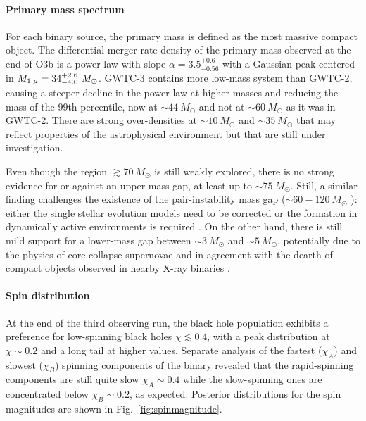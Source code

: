 \documentclass[a4paper,titlepage]{book}     	%
\newcommand{\sun}{\ensuremath{_\odot}}
\newcommand{\msun}{\ensuremath{M\sun}}
\begin{document}
\paragraph{Primary mass spectrum}
For each binary source, the primary mass is defined as the most massive compact object. The differential merger rate density of the primary mass observed at the end of O3b is a power-law with slope $\alpha = 3.5_{-0.56}^{+0.6}$ with a Gaussian peak centered in $M_{\rm 1,\mu} = 34_{-4.0}^{+2.6}~ \msun$. GWTC-3 contains more low-mass system than GWTC-2, causing a steeper decline in the power law at higher masses and reducing the mass of the 99th percentile, now at $\sim 44~\msun$ and not at $\sim 60~\msun$ as it was in GWTC-2. There are strong over-densities at $\sim 10~\msun$ and $\sim 35~\msun$ that may reflect properties of the astrophysical environment but that are still under investigation.

Even though the region $\gtrsim 70~\msun$ is still weakly explored, there is no strong evidence for or against an upper mass gap, at least up to $\sim 75~\msun$. Still, a similar finding challenges the existence of the pair-instability mass gap ($\sim 60 - 120~\msun$ \cite{spera2017_pisnSNe}): either the single stellar evolution models need to be corrected \cite{MassGapStellarEvo_Costa2021} or the formation in dynamically active environments is required \cite{Rastello2021_dynamics}. On the other hand, there is still mild support for a lower-mass gap between $\sim 3~\msun$ and $\sim 5~\msun$, potentially due to the physics of core-collapse supernovae and in agreement with the dearth of compact objects observed in nearby X-ray binaries \cite{massgapreal_ozel2010}.




\paragraph{Spin distribution}
At the end of the third observing run, the black hole population exhibits a preference for low-spinning black holes $\chi \lesssim 0.4$, with a peak distribution at $\chi \sim 0.2$ and a long tail at higher values. Separate analysis of the fastest ($\chi_A$) and slowest ($\chi_B$) spinning components of the binary revealed that the rapid-spinning components are still quite slow $\chi_A \sim 0.4$ while the slow-spinning ones are concentrated below $\chi_B \sim 0.2$, as expected. Posterior distributions for the spin magnitudes are shown in Fig.\ \ref{fig:spinmagnitude}.
\end{document}

